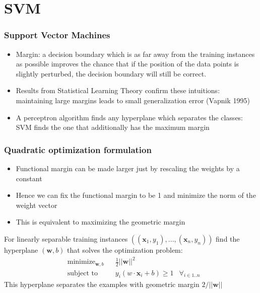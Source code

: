 \documentclass{beamer}
\newcommand{\vecb}[1]{\mathbf{#1}}
\newcommand{\x}{\mathbf{x}}
\begin{document}
\section{SVM}
\begin{frame}
 \frametitle{Support Vector Machines}
\begin{itemize}
\item Margin: a decision boundary which is as far away from the
  training instances as possible improves the chance that if the
  position of the data points is slightly perturbed, the decision
  boundary will still be correct.
\item Results from Statistical Learning Theory confirm these
  intuitions: maintaining large margins leads to small generalization
  error (Vapnik 1995)
\item A perceptron algorithm finds any hyperplane which separates the
  classes: SVM finds the one that additionally has the maximum margin
\end{itemize}
\end{frame}


\begin{frame}\frametitle{Quadratic optimization formulation}
\begin{itemize}
\item Functional margin can be made larger just by rescaling the
  weights by a constant
\item Hence we can fix the functional margin to be 1 and minimize the
  norm of the weight vector
\item This is equivalent to maximizing the geometric margin
\end{itemize}
\begin{block}{}
  For linearly separable training instances
  $((\x_1,y_1),...,(\x_n,y_n))$ find the hyperplane $(\vecb{w},b)$
  that solves the optimization problem:
\begin{equation}
\begin{aligned}
& \text{minimize}_{\vecb{w},b} & & \frac{1}{2}||\vecb{w}||^2\\
& \text{subject to}            & & y_i(w\cdot\x_i + b) \geq 1 & \forall_{i \in 1..n}
\end{aligned}
\end{equation}
This hyperplane separates the examples with geometric margin
$2/||\vecb{w}||$
\end{block}
\end{frame}
\end{document}
